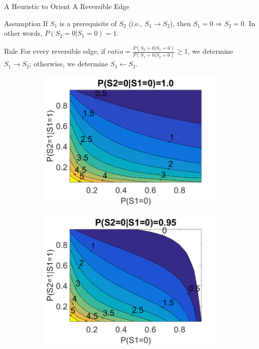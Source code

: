 \documentclass[hyperref={pdfpagelabels=false}]{beamer}
\begin{document}
\begin{frame}{A Heuristic to Orient A Reversible Edge}
	\begin{block}{Assumption}\small
		If $S_1$ is a prerequisite of $S_2$ (i.e., $S_1\rightarrow S_2$), then $S_1=0\Rightarrow S_2=0 $.
		In other words, $P(S_2=\text{0}|S_1=0)=1$.	
	\end{block}

	\begin{block}{Rule}\small
		For every reversible edge, if $ratio=\frac{P(S_2=0|S_1=0)}{P(S_1=0|S_2=0)}\ge 1$, we determine $S_1\rightarrow S_2$; otherwise, we determine $S_1\leftarrow S_2$.	
	\end{block}
	
		\begin{figure}[!ht]\small
			\centering
			\begin{subfigure}[t]{0.32\linewidth}
				\centering
				\includegraphics[width=1.0\linewidth]{figures/contour1.png}
			\end{subfigure}
			\begin{subfigure}[t]{0.32\linewidth}
				\centering
				\includegraphics[width=1.0\linewidth]{figures/contour2.png}

\end{subfigure}
\end{figure}
\end{frame}
\end{document}
